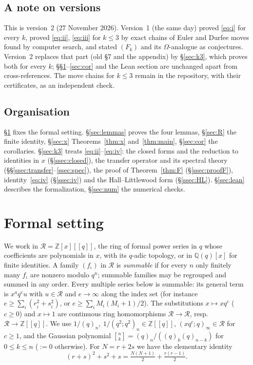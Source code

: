 \documentclass[11pt]{amsart}
\theoremstyle{definition}
\numberwithin{equation}{section}
\newcommand{\Z}{\mathbb{Z}}
\newcommand{\Q}{\mathbb{Q}}
\newcommand{\R}{\mathcal{R}}
\newcommand{\qbin}[2]{\genfrac{[}{]}{0pt}{}{#1}{#2}}
\begin{document}
\subsection{A note on versions}
This is version~2 (27 November 2026). Version~1 (the same day) proved \eqref{eq:i} for every $k$, proved
\eqref{eq:ii}, \eqref{eq:iii} for $k\le3$ by exact chains of Euler and Durfee moves found by computer search, and
stated $(F_k)$ and its $\Omega$-analogue as conjectures. Version~2 replaces that part (old §7 and the appendix) by
§\ref{sec:k3}, which proves both for every $k$; §§\ref{sec:setting}--\ref{sec:cor} and the Lean section are
unchanged apart from cross-references. The move chains for $k\le3$ remain in the repository, with their certificates, as an independent
check.

\subsection{Organisation}
§\ref{sec:setting} fixes the formal setting. §\ref{sec:lemmas} proves the four lemmas,
§\ref{sec:R} the finite identity, §\ref{sec:x} Theorems~\ref{thm:x} and~\ref{thm:main},
§\ref{sec:cor} the corollaries. §\ref{sec:k3} treats \eqref{eq:ii}--\eqref{eq:iv}: the closed forms and the reduction to
identities in $x$ (§\ref{ssec:closed}), the transfer operator and its spectral theory
(§§\ref{ssec:transfer}--\ref{ssec:spec}), the proof of Theorem~\ref{thm:F} (§\ref{ssec:proofF}), identity~\eqref{eq:iv}
(§\ref{ssec:iv}) and the Hall--Littlewood form (§\ref{ssec:HL}). §\ref{sec:lean} describes the formalization,
§\ref{sec:num} the numerical checks.

\section{Formal setting}\label{sec:setting}

We work in $\R=\Z[x][[q]]$, the ring of formal power series in $q$ whose coefficients are polynomials
in $x$, with its $q$-adic topology, or in $\Q(q)[x]$ for finite identities. A family $(f_\iota)$ in
$\R$ is \emph{summable} if for every $n$ only finitely many $f_\iota$ are nonzero modulo $q^n$; summable
families may be regrouped and summed in any order. Every multiple series below is summable: its
general term is $x^aq^eu$ with $u\in\R$ and $e\to\infty$ along the index set (for instance
$e\ge\sum_i(r_i^2+s_i^2)$, or $e\ge\sum_iM_i(M_i+1)/2$). The substitutions $x\mapsto xq^c$ ($c\ge0$)
and $x\mapsto1$ are continuous ring homomorphisms $\R\to\R$, resp.\ $\R\to\Z[[q]]$. We use
$1/(q)_n,\ 1/(q^2;q^2)_n\in\Z[[q]]$, $(xq^c;q)_\infty\in\R$ for $c\ge1$, and the Gaussian
polynomial $\qbin nk=(q)_n/((q)_k(q)_{n-k})$ for $0\le k\le n$ ($:=0$ otherwise). For $N=r+2s$ we have
the elementary identity
\begin{equation}\label{eq:01}
(r+s)^2+s^2+s=\tfrac{N(N+1)}2+\tfrac{r(r-1)}2 .
\end{equation}
\end{document}
